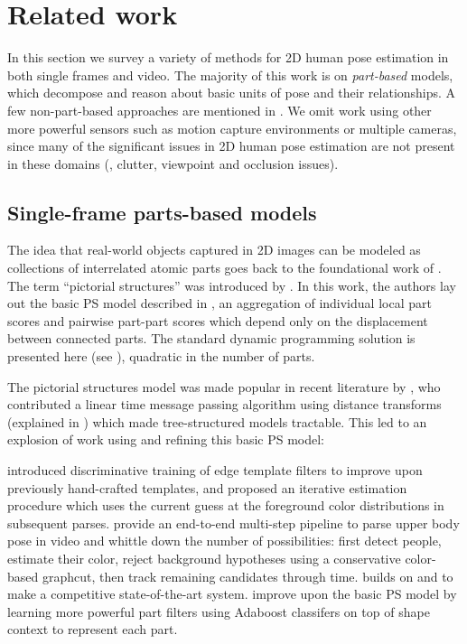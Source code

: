 \chapter{Related work}\label{sec:rel}

In this section we survey a variety of methods for 2D human pose estimation in 
both single frames and video.  The majority of this work is on {\em part-based} 
models, which decompose and reason about basic units of pose and their 
relationships.  A few non-part-based approaches are mentioned in 
.  We omit work using other more powerful sensors such as 
motion capture environments or multiple cameras, since many of the significant 
issues in 2D human pose estimation are not present in these domains (\eg, 
clutter, viewpoint and occlusion issues).

\section{Single-frame parts-based models}\label{sec:partsbased}

The idea that real-world objects captured in 2D images can be modeled as 
collections of interrelated atomic parts goes back to the foundational work of 
\citet{binford71}. The term ``pictorial structures'' was introduced by 
\citet{fischler1973ps}.  In this work, the authors lay out the basic PS model 
described in , an aggregation of individual local part scores and 
pairwise part-part scores which depend only on the displacement between 
connected parts.  The standard dynamic programming solution is presented here 
(see ), quadratic in the number of parts.  

The pictorial structures model was made popular in recent literature by 
\citet{felz05}, who contributed a linear time message passing algorithm using 
distance transforms (explained in ) which made tree-structured 
models tractable.  This led to an explosion of work using and refining this 
basic PS model:

\citet{devaparse} introduced discriminative training of edge template filters 
to improve upon previously hand-crafted templates, and proposed an iterative 
estimation procedure which uses the current guess at the foreground color 
distributions in subsequent parses.  \citet{ferrari08} provide an end-to-end 
multi-step pipeline to parse upper body pose in video and whittle down the 
number of possibilities: first detect people, estimate their color, reject 
background hypotheses using a conservative color-based graphcut, then track 
remaining candidates through time.  \citet{eichner-tr} builds on 
\citet{ferrari08} and \citet{devaparse} to make a competitive state-of-the-art 
system.  \citet{andriluka09} improve upon the basic PS model by learning more 
powerful part filters using Adaboost classifers on top of shape context to 
represent each part.

